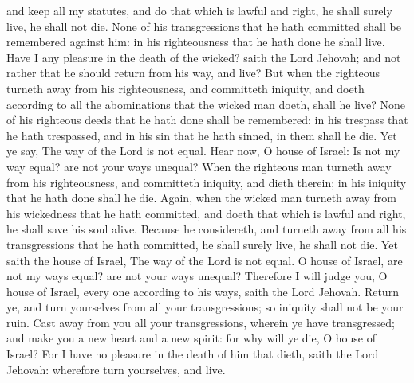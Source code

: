 and keep all my statutes, and do that which is lawful and right, he shall surely live, he shall not die. None of his transgressions that he hath committed shall be remembered against him: in his righteousness that he hath done he shall live. Have I any pleasure in the death of the wicked? saith the Lord Jehovah; and not rather that he should return from his way, and live? But when the righteous turneth away from his righteousness, and committeth iniquity, and doeth according to all the abominations that the wicked man doeth, shall he live? None of his righteous deeds that he hath done shall be remembered: in his trespass that he hath trespassed, and in his sin that he hath sinned, in them shall he die.  Yet ye say, The way of the Lord is not equal. Hear now, O house of Israel: Is not my way equal? are not your ways unequal? When the righteous man turneth away from his righteousness, and committeth iniquity, and dieth therein; in his iniquity that he hath done shall he die. Again, when the wicked man turneth away from his wickedness that he hath committed, and doeth that which is lawful and right, he shall save his soul alive. Because he considereth, and turneth away from all his transgressions that he hath committed, he shall surely live, he shall not die. Yet saith the house of Israel, The way of the Lord is not equal. O house of Israel, are not my ways equal? are not your ways unequal? Therefore I will judge you, O house of Israel, every one according to his ways, saith the Lord Jehovah. Return ye, and turn yourselves from all your transgressions; so iniquity shall not be your ruin. Cast away from you all your transgressions, wherein ye have transgressed; and make you a new heart and a new spirit: for why will ye die, O house of Israel? For I have no pleasure in the death of him that dieth, saith the Lord Jehovah: wherefore turn yourselves, and live. 

